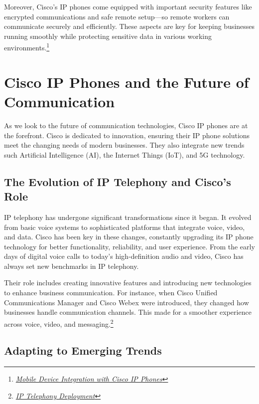 \documentclass[11pt,a4paper]{article}
\begin{document}
Moreover, Cisco's IP phones come equipped with important security features like encrypted communications and safe remote setup—so remote workers can communicate securely and efficiently. These aspects are key for keeping businesses running smoothly while protecting sensitive data in various working environments.\footnote{\href{https://www.cisco.com/c/dam/m/en_in/pdf/why-endpoint-security-remote.pdf}{\textit{Mobile Device Integration with Cisco IP Phones}}}


\section*{Cisco IP Phones and the Future of Communication}

As we look to the future of communication technologies, Cisco IP phones are at the forefront. Cisco is dedicated to innovation, ensuring their IP phone solutions meet the changing needs of modern businesses. They also integrate new trends such  Artificial Intelligence (AI), the Internet Things (IoT), and 5G technology.


\subsection*{The Evolution of IP Telephony and Cisco’s Role}

IP telephony has undergone significant transformations since it began. It evolved from basic voice systems to sophisticated platforms that integrate voice, video, and data. Cisco has been key in these changes, constantly upgrading its IP phone technology for better functionality, reliability, and user experience. From the early days of digital voice calls to today’s high-definition audio and video,
Cisco has always set new benchmarks in IP telephony.

Their role includes creating innovative features and introducing new technologies to enhance business communication. For instance, when Cisco Unified Communications Manager and Cisco Webex were introduced, they changed how businesses handle communication channels. This made for a smoother experience across voice, video, and messaging.\footnote{\href{https://www.cisco.com/c/dam/en_us/about/ciscoitatwork/downloads/ciscoitatwork/pdf/cisco_ip_telephony.pdf}{\textit{IP Telephony Deployment}}}


\subsection*{Adapting to Emerging Trends}
\end{document}
